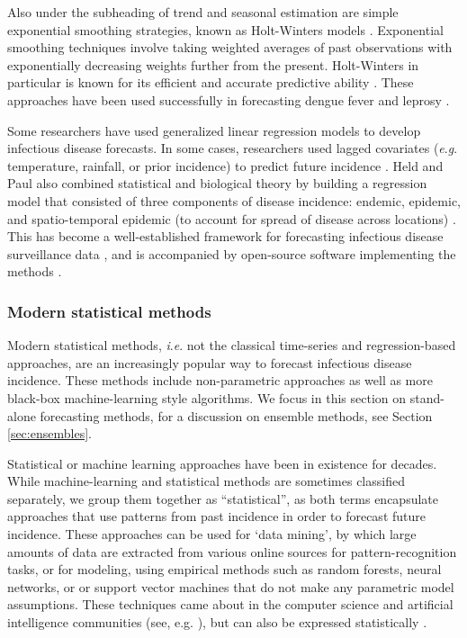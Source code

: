 \documentclass[a4paper]{article}
\newcommand{\ie}{\textit{i}.\textit{e}. }
\newcommand{\eg}{\textit{e}.\textit{g}. }
\begin{document}
Also under the subheading of trend and seasonal estimation are simple exponential smoothing strategies, known as Holt-Winters models \cite{holt2004forecasting, winters1960forecasting}.
Exponential smoothing techniques involve taking weighted averages of past observations with exponentially decreasing weights further from the present.
Holt-Winters in particular is known for its efficient and accurate predictive ability \cite{gelper2010robust, goodwin2010holt}.
These approaches have been used successfully in forecasting dengue fever \cite{buczak2018ensemble} and leprosy \cite{deiner2017short}.

Some researchers have used generalized linear regression models to develop infectious disease forecasts.
In some cases, researchers used lagged covariates (\eg temperature, rainfall, or prior incidence) to predict future incidence \cite{Haemig2011, Hii2012, Lowe2011, Moore2012,Reich2016a}.
Held and Paul also combined statistical and biological theory by building a regression model that consisted of three components of disease incidence: endemic, epidemic, and spatio-temporal epidemic (to account for spread of disease across locations) \cite{held2005statistical}.
This has become a well-established framework for forecasting infectious disease surveillance data \cite{Hohle2014,held2017probabilistic,Ray2017}, and is accompanied by open-source software implementing the methods \cite{meyer2017}. 

\subsubsection{Modern statistical methods}

Modern statistical methods, \ie not the classical time-series and regression-based approaches, are an increasingly popular way to forecast infectious disease incidence.
These methods include non-parametric approaches as well as more black-box machine-learning style algorithms.
We focus in this section on stand-alone forecasting methods, for a discussion on ensemble methods, see Section \ref{sec:ensembles}.

Statistical or machine learning approaches have been in existence for decades.
While machine-learning and statistical methods are sometimes classified separately\cite{Siettos2013}, we group them together as ``statistical'', as both terms encapsulate approaches that use patterns from past incidence in order to forecast future incidence.\cite{Myers2000}
These approaches can be used for `data mining', by which large amounts of data are extracted from various online sources for pattern-recognition tasks, or for modeling, using empirical methods such as random forests, neural networks, or or support vector machines that do not make any parametric model assumptions.
These techniques came about in the computer science and artificial intelligence communities (see, e.g. \cite{ho1995random}), but can also be expressed statistically \cite{Hastie2009}.
\end{document}
